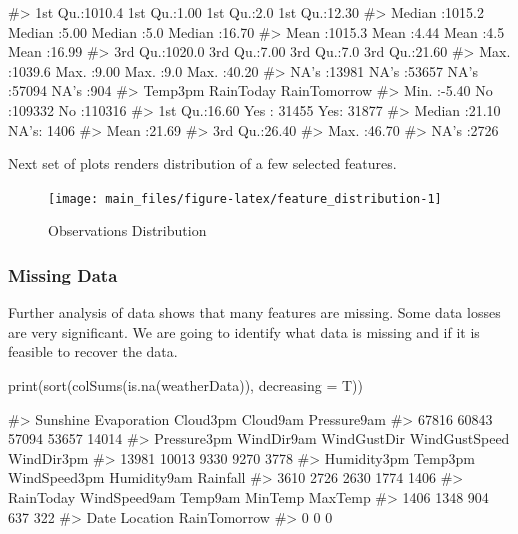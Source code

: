 \begin{Schunk}
\begin{Soutput}
#>  1st Qu.:1010.4   1st Qu.:1.00    1st Qu.:2.0     1st Qu.:12.30  
#>  Median :1015.2   Median :5.00    Median :5.0     Median :16.70  
#>  Mean   :1015.3   Mean   :4.44    Mean   :4.5     Mean   :16.99  
#>  3rd Qu.:1020.0   3rd Qu.:7.00    3rd Qu.:7.0     3rd Qu.:21.60  
#>  Max.   :1039.6   Max.   :9.00    Max.   :9.0     Max.   :40.20  
#>  NA's   :13981    NA's   :53657   NA's   :57094   NA's   :904    
#>     Temp3pm      RainToday     RainTomorrow
#>  Min.   :-5.40   No  :109332   No :110316  
#>  1st Qu.:16.60   Yes : 31455   Yes: 31877  
#>  Median :21.10   NA's:  1406               
#>  Mean   :21.69                             
#>  3rd Qu.:26.40                             
#>  Max.   :46.70                             
#>  NA's   :2726
\end{Soutput}
\end{Schunk}

Next set of plots renders distribution of a few selected features.

\begin{Schunk}
\begin{figure}[H]

{\centering \texttt{[image: main\_files/figure-latex/feature\_distribution-1]} 

}

\caption[Observations Distribution]{Observations Distribution}\label{fig:feature_distribution}
\end{figure}
\end{Schunk}

\hypertarget{missing-data}{%
\subsubsection{Missing Data}\label{missing-data}}

Further analysis of data shows that many features are missing. Some data
losses are very significant. We are going to identify what data is
missing and if it is feasible to recover the data.

\begin{Schunk}
\begin{Sinput}
print(sort(colSums(is.na(weatherData)), decreasing = T))
\end{Sinput}
\begin{Soutput}
#>      Sunshine   Evaporation      Cloud3pm      Cloud9am   Pressure9am 
#>         67816         60843         57094         53657         14014 
#>   Pressure3pm    WindDir9am   WindGustDir WindGustSpeed    WindDir3pm 
#>         13981         10013          9330          9270          3778 
#>   Humidity3pm       Temp3pm  WindSpeed3pm   Humidity9am      Rainfall 
#>          3610          2726          2630          1774          1406 
#>     RainToday  WindSpeed9am       Temp9am       MinTemp       MaxTemp 
#>          1406          1348           904           637           322 
#>          Date      Location  RainTomorrow 
#>             0             0             0
\end{Soutput}
\end{Schunk}

